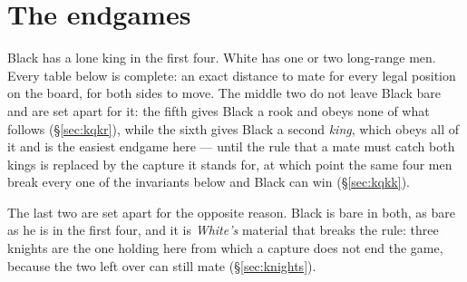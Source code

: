 \documentclass[11pt]{article}
\begin{document}

\vspace{4mm}

\setcounter{tocdepth}{2}
\clearpage
\tableofcontents

\section{The endgames}\label{sec:endgames}

Black has a lone king in the first four. White has one or two long-range men.
Every table below is complete: an exact distance to mate for every legal
position on the board, for both sides to move. The middle two do not leave
Black bare and are set apart for it: the fifth gives Black a rook and obeys none
of what follows (\S\ref{sec:kqkr}), while the sixth gives Black a second \emph{king}, which
obeys all of it and is the easiest endgame here --- until the rule that a mate
must catch both kings is replaced by the capture it stands for, at which point
the same four men break every one of the invariants below and Black can win
(\S\ref{sec:kqkk}).

The last two are set apart for the opposite reason. Black is bare in both, as
bare as he is in the first four, and it is \emph{White's} material that breaks
the rule: three knights are the one holding here from which a capture does not
end the game, because the two left over can still mate (\S\ref{sec:knights}).
\end{document}
